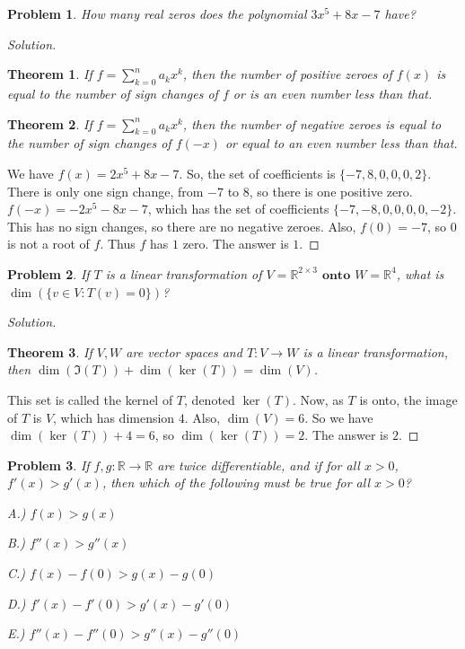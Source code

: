 \documentclass[crop=false,class=book]{standalone}
\theoremstyle{mystyle}
\newtheorem{problem}{Problem}[section]
\newtheorem*{theorem*}{Theorem}
\begin{document}
\begin{problem}
How many real zeros does the polynomial $3x^5+8x-7$ have?
\end{problem}
\begin{proof}[Solution]
\begin{theorem*}
If $f = \sum_{k=0}^{n} a_k x^k$, then the number of positive zeroes of $f(x)$ is equal to the number of sign changes of $f$ or is an even number less than that.
\end{theorem*}
\begin{theorem*}
If $f=\sum_{k=0}^{n} a_k x^k$, then the number of negative zeroes is equal to the number of sign changes of $f(-x)$ or equal to an even number less than that.
\end{theorem*}
We have $f(x) = 2x^5+8x - 7$. So, the set of coefficients is $\{-7,8,0,0,0,2\}$. There is only one sign change, from $-7$ to $8$, so there is one positive zero. $f(-x) = -2x^5 - 8x - 7$, which has the set of coefficients $\{-7,-8,0,0,0,0,-2\}$. This has no sign changes, so there are no negative zeroes. Also, $f(0) = -7$, so $0$ is not a root of $f$. Thus $f$ has $1$ zero. The answer is $1$.
\end{proof}
\begin{problem}
If $T$ is a linear transformation of $V = \mathbb{R}^{2\times 3}$ $\textbf{onto}$ $W = \mathbb{R}^4$, what is $\dim(\{v\in V:T(v) = 0\})$?
\end{problem}
\begin{proof}[Solution]
\begin{theorem*}
If $V,W$ are vector spaces and $T:V\rightarrow W$ is a linear transformation, then $\dim(\Im(T)) + \dim(\ker(T)) = \dim(V)$.
\end{theorem*}
This set is called the kernel of $T$, denoted $\ker(T)$. Now, as $T$ is onto, the image of $T$ is $V$, which has dimension $4$. Also, $\dim(V) = 6$. So we have $\dim(\ker(T)) + 4 = 6$, so $\dim(\ker(T)) = 2$. The answer is $2$.
\end{proof}
\begin{problem}
If $f,g:\mathbb{R}\rightarrow \mathbb{R}$ are twice differentiable, and if for all $x>0$, $f'(x)>g'(x)$, then which of the following must be true for all $x>0$?
\begin{enumerate}
    \begin{multicols}{3}
    \item[A.)] $f(x)>g(x)$
    \item[B.)] $f''(x)>g''(x)$
    \item[C.)] $f(x)-f(0)>g(x)-g(0)$
    \item[D.)] $f'(x)-f'(0)>g'(x)-g'(0)$
    \item[E.)] $f''(x) - f''(0)>g''(x)-g''(0)$
    \end{multicols}
\end{enumerate}
\end{problem}
\end{document}
